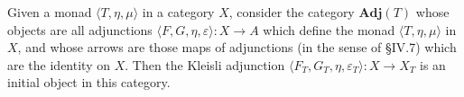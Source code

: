 Given a monad $\langle T, \eta, \mu \rangle$ in a category $X$, consider the category $\mathbf{Adj}(T)$ whose objects are all adjunctions $\langle F, G, \eta, \varepsilon \rangle : X \to A$ which define the monad $\langle T, \eta, \mu \rangle$ in $X$, and whose arrows are those maps of adjunctions (in the sense of \S IV.7) which are the identity on $X$. Then the Kleisli adjunction $\langle F_T, G_T, \eta, \varepsilon_T \rangle : X \to X_T$ is an initial object in this category.
